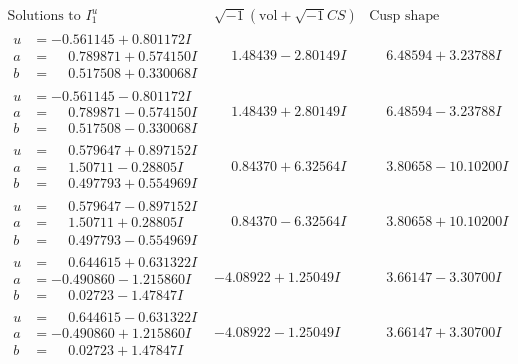 \documentclass[1p]{elsarticle_modified}
\theoremstyle{definition}
\newcommand{\I}{\sqrt{-1}}
\begin{document}
$$\begin{array}{c|c|c}  
\text{Solutions to }I^u_{1}& \I (\text{vol} + \sqrt{-1}CS) & \text{Cusp shape}\\
 \hline 
\begin{aligned}
u &= -0.561145 + 0.801172 I \\
a &= \phantom{-}0.789871 + 0.574150 I \\
b &= \phantom{-}0.517508 + 0.330068 I\end{aligned}
 & \phantom{-}1.48439 - 2.80149 I & \phantom{-}6.48594 + 3.23788 I \\ \hline\begin{aligned}
u &= -0.561145 - 0.801172 I \\
a &= \phantom{-}0.789871 - 0.574150 I \\
b &= \phantom{-}0.517508 - 0.330068 I\end{aligned}
 & \phantom{-}1.48439 + 2.80149 I & \phantom{-}6.48594 - 3.23788 I \\ \hline\begin{aligned}
u &= \phantom{-}0.579647 + 0.897152 I \\
a &= \phantom{-}1.50711 - 0.28805 I \\
b &= \phantom{-}0.497793 + 0.554969 I\end{aligned}
 & \phantom{-}0.84370 + 6.32564 I & \phantom{-}3.80658 - 10.10200 I \\ \hline\begin{aligned}
u &= \phantom{-}0.579647 - 0.897152 I \\
a &= \phantom{-}1.50711 + 0.28805 I \\
b &= \phantom{-}0.497793 - 0.554969 I\end{aligned}
 & \phantom{-}0.84370 - 6.32564 I & \phantom{-}3.80658 + 10.10200 I \\ \hline\begin{aligned}
u &= \phantom{-}0.644615 + 0.631322 I \\
a &= -0.490860 - 1.215860 I \\
b &= \phantom{-}0.02723 - 1.47847 I\end{aligned}
 & -4.08922 + 1.25049 I & \phantom{-}3.66147 - 3.30700 I \\ \hline\begin{aligned}
u &= \phantom{-}0.644615 - 0.631322 I \\
a &= -0.490860 + 1.215860 I \\
b &= \phantom{-}0.02723 + 1.47847 I\end{aligned}
 & -4.08922 - 1.25049 I & \phantom{-}3.66147 + 3.30700 I \\ \hline\begin{aligned}

\end{aligned}
\end{array}$$
\end{document}
